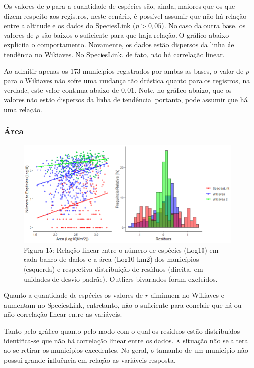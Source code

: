 \begin{resposta}
Os valores de $p$ para a quantidade de espécies são, ainda, maiores que os que dizem respeito aos registros, neste cenário, é possível assumir que não há relação entre a altitude e os dados do SpeciesLink ($p > 0,05$). No caso da outra base, os valores de $p$ são baixos o suficiente para que haja relação. O gráfico abaixo explicita o comportamento. Novamente, os dados estão dispersos da linha de tendência no Wikiaves. No SpeciesLink, de fato, não há correlação linear.

Ao admitir apenas os 173 municípios registrados por ambas as bases, o valor de $p$ para o Wikiaves não sofre uma mudança tão drástica quanto para os registros, na verdade, este valor continua abaixo de $0,01$. Note, no gráfico abaixo, que os valores não estão dispersos da linha de tendência, portanto, pode assumir que há uma relação.
\end{resposta}

\subsubsection{Área}



\begin{figure}[h!]
\centering
\includegraphics[width = 15cm]{Imagens/G07.png}
\\{\scriptsize Figura 15: Relação linear entre o número de espécies (Log10) em cada banco de dados e a área (Log10 km2) dos municípios (esquerda) e respectiva distribuição de resíduos (direita, em unidades de desvio-padrão). Outliers bivariados foram excluídos.}
\end{figure}

 \begin{resposta}
Quanto a quantidade de espécies os valores de $r$ diminuem no Wikiaves e aumentam no SpeciesLink, entretanto, não o suficiente para concluir que há ou não correlação linear entre as variáveis.

Tanto pelo gráfico quanto pelo modo com o qual os resíduos estão distribuídos identifica-se que não há correlação linear entre os dados. A situação não se altera ao se retirar os municípios excedentes. No geral, o tamanho de um município não possui grande influência em relação as variáveis resposta.
\end{resposta}

